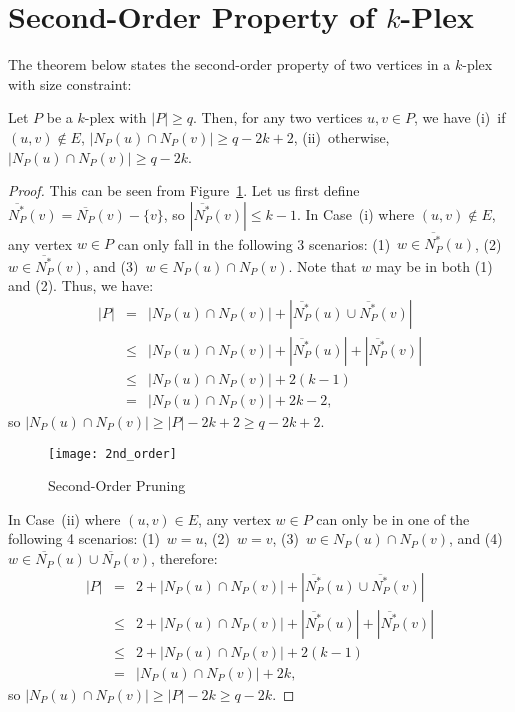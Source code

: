 \documentclass[sigconf, nonacm]{acmart}
\begin{document}
\section{Second-Order Property of $k$-Plex}\label{appendix:truss}
The theorem below states the second-order property of two vertices in a $k$-plex with size constraint:
\begin{theorem}
\label{lemma::2nd_order}
Let $P$ be a $k$-plex with $|P|\ge q$. Then, for any two vertices $u, v \in P$, we have (i)~if $(u,v)\not\in E$, $|N_P(u)\cap N_P(v)|\ge q-2k+2$, (ii)~otherwise, $|N_P(u)\cap N_P(v)|\ge q-2k$. 
\end{theorem}
\begin{proof} This can be seen from Figure~\ref{2nd_order}. Let us first define $\overline{N^*_P}(v) = \overline{N_P}(v) - \{v\}$, so $|\overline{N^*_P}(v)| \leq k-1$. 
%
In Case~(i) where $(u, v)\not\in E$, any vertex $w\in P$ can only fall in the following 3 scenarios: (1)~$w\in\overline{N^*_P}(u)$, (2)~$w\in\overline{N^*_P}(v)$, and (3)~$w\in N_P(u)\cap N_P(v)$. Note that $w$ may be in both (1) and (2). Thus, we have:
\begin{eqnarray}
|P| & = & |N_P(u)\cap N_P(v)| + |\overline{N^*_P}(u)\cup\overline{N^*_P}(v)|\nonumber\\
& \leq & |N_P(u)\cap N_P(v)| + |\overline{N^*_P}(u)| + |\overline{N^*_P}(v)|\nonumber\\
& \leq & |N_P(u)\cap N_P(v)| + 2(k-1)\nonumber\\
& = & |N_P(u)\cap N_P(v)| + 2k-2,\nonumber
\end{eqnarray}
so $|N_P(u)\cap N_P(v)|\ge |P|-2k+2\ge q-2k+2$.

\begin{figure}[t]
\centering
\texttt{[image: 2nd\_order]}
\caption{Second-Order Pruning}\label{2nd_order}
\vspace{3mm}
\end{figure}

In Case~(ii) where $(u, v)\in E$, any vertex $w\in P$ can only be in one of the following 4 scenarios: (1)~$w=u$, (2)~$w=v$, (3)~$w\in N_P(u)\cap N_P(v)$, and (4)~$w\in\overline{N_P}(u)\cup\overline{N_P}(v)$, therefore:
\begin{eqnarray}
|P| & = & 2 + |N_P(u)\cap N_P(v)| + |\overline{N^*_P}(u)\cup\overline{N^*_P}(v)|\nonumber\\
& \leq & 2 + |N_P(u)\cap N_P(v)| + |\overline{N^*_P}(u)| + |\overline{N^*_P}(v)|\nonumber\\
& \leq & 2 + |N_P(u)\cap N_P(v)| + 2(k-1)\nonumber\\
& = & |N_P(u)\cap N_P(v)| + 2k,\nonumber
\end{eqnarray}
so $|N_P(u)\cap N_P(v)|\ge |P|-2k\ge q-2k$. \end{proof}
\end{document}
